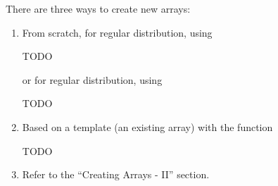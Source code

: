 There are three ways to create new arrays:
\begin{enumerate}
\item From scratch, for regular distribution, using

TODO
%
%
%
%
%
%

or for regular distribution, using

TODO
%
%
%
%
%
%
%

\item Based on a template (an existing array) with the function

TODO
%
%
%
%
%

\item Refer to the ``Creating Arrays - II'' section.
\end{enumerate}


